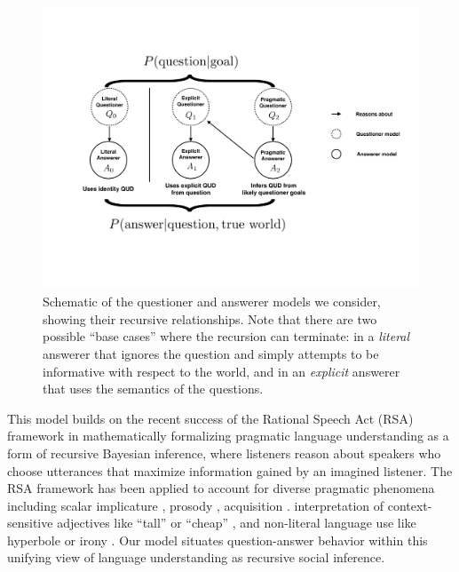 \documentclass[12pt, floatsintext, jou]{apa6}
\begin{document}
\begin{figure}[t]
\begin{center}
\includegraphics[scale = .5]{models.pdf}
\end{center}
\caption{Schematic of the questioner and answerer models we consider, showing their recursive relationships. Note that there are two possible ``base cases'' where the recursion can terminate: in a \emph{literal} answerer that ignores the question and simply attempts to be informative with respect to the world, and in an \emph{explicit} answerer that uses the semantics of the questions.}
\label{fig:models}
\end{figure}

This model builds on the recent success of the Rational Speech Act (RSA) framework \cite{FrankGoodman12_PragmaticReasoningLanguageGames, GoodmanStuhlmuller13_KnowledgeImplicature, GoodmanFrank16_RSATiCS} in mathematically formalizing pragmatic language understanding as a form of recursive Bayesian inference, where listeners reason about speakers who choose utterances that maximize information gained by an imagined listener. The RSA framework has been applied to account for diverse pragmatic phenomena including scalar implicature \cite{GoodmanStuhlmuller13_KnowledgeImplicature}, prosody \cite{BergenGoodman15_StrategicUseOfNoise},
acquisition \cite{FrankGoodman14_InferringWordMeanings}. 
interpretation of context-sensitive adjectives like ``tall'' or ``cheap'' \cite{LassiterGoodman15_AdjectivalVagueness}, and
non-literal language use like hyperbole \cite{KaoWuBergenGoodman14_NonliteralNumberWords} or irony \cite{KaoGoodman15_IronyCogSci}.
Our model situates question-answer behavior within this unifying view of language understanding as recursive social inference. 
\end{document}
